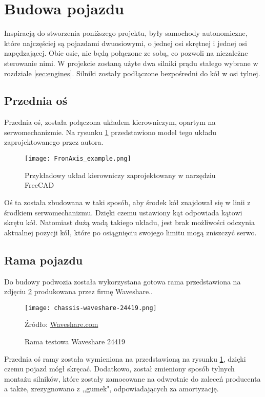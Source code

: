 \section{Budowa pojazdu}
    Inspiracją do stworzenia poniższego projektu, były samochody autonomiczne, które najczęściej są pojazdami dwuosiowymi, o jednej osi skrętnej i jednej osi napędzającej.
    Obie osie, nie będą połączone ze sobą, co pozwoli na niezależne sterowanie nimi.
    W projekcie zostaną użyte dwa silniki prądu stałego wybrane w rozdziale \ref{sec:engines}.
    Silniki zostały podłączone bezpośredni do kół w osi tylnej.
    \subsection{Przednia oś}
        Przednia oś, została połączona układem kierowniczym, opartym na serwomechanizmie.
        Na rysunku \ref{fig:frontAxis_model} przedstawiono model tego układu zaprojektowanego przez autora.

        \begin{figure}[!ht]
            \centering
            \texttt{[image: FronAxis\_example.png]}
            \caption{Przykładowy układ kierowniczy zaprojektowany w narzędziu FreeCAD}
            \label{fig:frontAxis_model}
        \end{figure}
        Oś ta została zbudowana w taki sposób, aby środek kół znajdował się w linii z środkiem serwomechanizmu.
        Dzięki czemu ustawiony kąt odpowiada kątowi skrętu kół.
        Natomiast dużą wadą takiego układu, jest brak możliwości odczynia aktualnej pozycji kół, które po osiągnięciu swojego limitu mogą zniszczyć serwo.

    \subsection{Rama pojazdu}
    Do budowy podwozia została wykorzystana gotowa rama przedstawiona na zdjęciu \ref{fig:test_chassis} produkowana przez firmę Waveshare..
    \begin{figure}[!ht]
        \centering
        \texttt{[image: chassis-waveshare-24419.png]}
        \caption{Rama testowa Waveshare 24419}
        Źródło: \href{https://www.waveshare.com/robot-chassis.htm?sku=24419}{Waveshare.com}
        \label{fig:test_chassis}
    \end{figure}

    Przednia oś ramy została wymieniona na przedstawioną na rysunku \ref{fig:frontAxis_model}, dzięki czemu pojazd mógł skręcać.
    Dodatkowo, został zmieniony sposób tylnych montażu silników, które zostały zamocowane na odwrotnie do zaleceń producenta a także, zrezygnowano z ,,gumek", odpowiadających za amortyzację.


